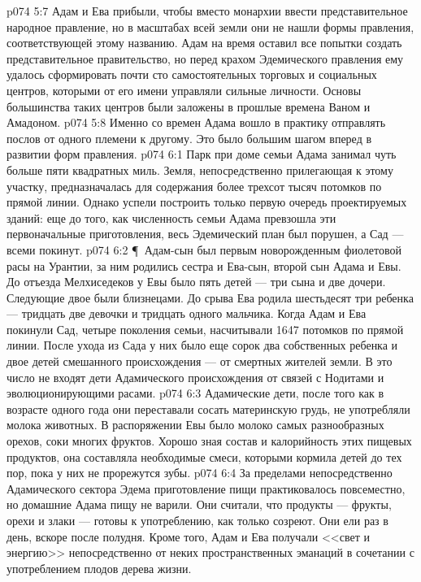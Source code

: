 \vs p074 5:7 Адам и Ева прибыли, чтобы вместо монархии ввести представительное народное правление, но в масштабах всей земли они не нашли формы правления, соответствующей этому названию. Адам на время оставил все попытки создать представительное правительство, но перед крахом Эдемического правления ему удалось сформировать почти сто самостоятельных торговых и социальных центров, которыми от его имени управляли сильные личности. Основы большинства таких центров были заложены в прошлые времена Ваном и Амадоном.
\vs p074 5:8 Именно со времен Адама вошло в практику отправлять послов от одного племени к другому. Это было большим шагом вперед в развитии форм правления.
\vs p074 6:1 Парк при доме семьи Адама занимал чуть больше пяти квадратных миль. Земля, непосредственно прилегающая к этому участку, предназначалась для содержания более трехсот тысяч потомков по прямой линии. Однако успели построить только первую очередь проектируемых зданий: еще до того, как численность семьи Адама превзошла эти первоначальные приготовления, весь Эдемический план был порушен, а Сад --- всеми покинут.
\vs p074 6:2 \P\ Адам\hyp{}сын был первым новорожденным фиолетовой расы на Урантии, за ним родились сестра и Ева\hyp{}сын, второй сын Адама и Евы. До отъезда Мелхиседеков у Евы было пять детей --- три сына и две дочери. Следующие двое были близнецами. До срыва Ева родила шестьдесят три ребенка --- тридцать две девочки и тридцать одного мальчика. Когда Адам и Ева покинули Сад, четыре поколения семьи, насчитывали 1647 потомков по прямой линии. После ухода из Сада у них было еще сорок два собственных ребенка и двое детей смешанного происхождения --- от смертных жителей земли. В это число не входят дети Адамического происхождения от связей с Нодитами и эволюционирующими расами.
\vs p074 6:3 Адамические дети, после того как в возрасте одного года они переставали сосать материнскую грудь, не употребляли молока животных. В распоряжении Евы было молоко самых разнообразных орехов, соки многих фруктов. Хорошо зная состав и калорийность этих пищевых продуктов, она составляла необходимые смеси, которыми кормила детей до тех пор, пока у них не прорежутся зубы.
\vs p074 6:4 За пределами непосредственно Адамического сектора Эдема приготовление пищи практиковалось повсеместно, но домашние Адама пищу не варили. Они считали, что продукты --- фрукты, орехи и злаки --- готовы к употреблению, как только созреют. Они ели раз в день, вскоре после полудня. Кроме того, Адам и Ева получали <<свет и энергию>> непосредственно от неких пространственных эманаций в сочетании с употреблением плодов дерева жизни.
